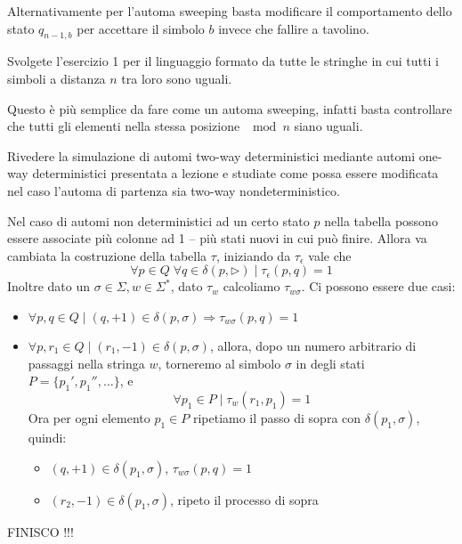 \documentclass[12pt, answers]{exam}
\begin{document}
\begin{questions}
\begin{solution}
		Alternativamente per l'automa sweeping basta modificare il comportamento dello stato $q_{n - 1, b}$ per accettare il simbolo $b$ invece che fallire a tavolino.
	\end{solution}
	\question Svolgete l'esercizio 1 per il linguaggio formato da tutte le stringhe in cui tutti i simboli a distanza $n$ tra loro sono uguali.
	\begin{solution}
		Questo è più semplice da fare come un automa sweeping, infatti basta controllare che tutti gli elementi nella stessa posizione $\mod n$ siano uguali.
	\end{solution}
	\question Rivedere la simulazione di automi two-way deterministici mediante automi one-way deterministici presentata a lezione e studiate come possa essere modificata nel caso l'automa di partenza sia two-way nondeterministico.
	\begin{solution}
		Nel caso di automi non deterministici ad un certo stato $p$ nella tabella possono essere associate più colonne ad 1 -- più stati nuovi in cui può finire.
		Allora va cambiata la costruzione della tabella $\tau$, iniziando da $\tau_\epsilon$ vale che
		$$ \forall p \in Q \; \forall q \in \delta(p, \rhd) \mid \tau_\epsilon(p, q) = 1 $$
		Inoltre dato un $\sigma \in \Sigma, w \in \Sigma^*$, dato $\tau_w$ calcoliamo $\tau_{w\sigma}$. Ci possono essere due casi:
		\begin{itemize}
			\item $ \forall p, q \in Q \mid (q, +1) \in \delta(p, \sigma) \Rightarrow \tau_{w\sigma}(p, q) = 1 $
			\item $ \forall p, r_1 \in Q \mid (r_1, -1) \in \delta(p, \sigma) $, allora, dopo un numero arbitrario di passaggi nella stringa $w$, torneremo al simbolo $\sigma$ in degli stati $P = \{p_1', p_1'', \dots\}$, e 
				$$ \forall p_1 \in P \mid \tau_w(r_1, p_1) = 1 $$
				Ora per ogni elemento $p_1 \in P$ ripetiamo il passo di sopra con $\delta(p_1, \sigma)$, quindi:
				\begin{itemize}
					\item $(q, +1) \in \delta(p_1, \sigma)$, $\tau_{w\sigma}(p, q) = 1$
					\item $(r_2, -1) \in \delta(p_1, \sigma)$, ripeto il processo di sopra 
				\end{itemize}
		\end{itemize}
		FINISCO !!! 
	\end{solution}
\end{questions}
\end{document}
